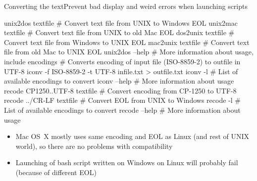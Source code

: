 \documentclass[compress, ucs, xelatex, 11pt, xcolor=svgnames,
  hyperref={
    bookmarks=true,
    unicode=true,
    colorlinks=true,
    pdftitle={Linux, command line and MetaCentrum},
    plainpages=false,
    pdfauthor={Vojtech Zeisek},
    pdfsubject={Course about use of Linux command line, writing shell scripts and using MetaCentrum of CESNET},
    pdfcreator={XeLaTeX},
    pdfkeywords={Linux, GNU, BASH, shell, command line, MetaCentrum},
    linkcolor=DarkRed,
    anchorcolor=DarkBlue,
    citecolor=Indigo,
    filecolor=NavyBlue,
    menucolor=DarkMagenta,
    urlcolor=DarkBlue,
    pdftex},
  url={hyphens, lowtilde} %
  ]{beamer}
\begin{document}
\begin{frame}[fragile]{Converting the text}{Prevent bad display and weird errors when launching scripts}
  \begin{bashcode}
    unix2dos textfile # Convert text file from UNIX to Windows EOL
    unix2mac textfile # Convert text file from UNIX to old Mac EOL
    dos2unix textfile # Convert text file from Windows to UNIX EOL
    mac2unix textfile # Convert text file from old Mac to UNIX EOL
    unix2dos --help # More information about usage, include encodings
    # Converts encoding of input file (ISO-8859-2) to outfile in UTF-8
    iconv -f ISO-8859-2 -t UTF-8 infile.txt > outfile.txt
    iconv -l # List of available encodings to convert
    iconv --help # More information about usage
    recode CP1250..UTF-8 textfile # Convert encoding from CP-1250 to UTF-8
    recode ../CR-LF textfile # Convert EOL from UNIX to Windows
    recode -l # List of available encodings to convert
    recode --help # More information about usage
  \end{bashcode}
  \begin{itemize}
    \item Mac OS~X mostly uses same encoding and EOL as Linux (and rest of UNIX world), so there are no problems with compatibility
    \item Launching of bash script written on Windows on Linux will probably fail (because of different EOL)
  \end{itemize}
\end{frame}
\end{document}
